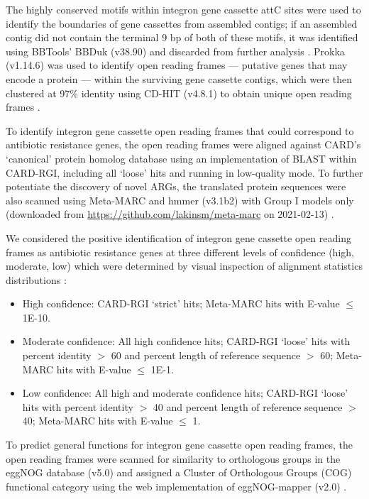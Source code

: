 The highly conserved motifs within integron gene cassette attC sites were used to identify the boundaries of gene cassettes from assembled contigs; if an assembled contig did not contain the terminal 9 bp of both of these motifs, it was identified using BBTools’ BBDuk (v38.90) and discarded from further analysis \parencite{Bushnell.2016}.
Prokka (v1.14.6) was used to identify open reading frames --- putative genes that may encode a protein --- within the surviving gene cassette contigs, which were then clustered at 97\% identity using CD-HIT (v4.8.1) to obtain unique open reading frames \parencite{Seemann.2014, Fu.2012}.

To identify integron gene cassette open reading frames that could correspond to antibiotic resistance genes, the open reading frames were aligned against \gls{CARD}’s ‘canonical’ protein homolog database using an implementation of BLAST within \gls{CARD}-RGI, including all ‘loose’ hits and running in low-quality mode.
To further potentiate the discovery of novel ARGs, the translated protein sequences were also scanned using Meta-MARC and hmmer (v3.1b2) with Group I models only (downloaded from \url{https://github.com/lakinsm/meta-marc} on 2021-02-13) \parencite{Lakin.2019, Wheeler.2013}.

We considered the positive identification of integron gene cassette open reading frames as antibiotic resistance genes at three different levels of confidence (high, moderate, low) which were determined by visual inspection of alignment statistics distributions \dummyfig:

\begin{itemize}
	\item{High confidence: \gls{CARD}-RGI ‘strict’ hits; Meta-MARC hits with E-value $\leq$ 1E-10.}
	\item{Moderate confidence: All high confidence hits; \gls{CARD}-RGI ‘loose’ hits with percent identity $>$ 60 and percent length of reference sequence $>$ 60; Meta-MARC hits with E-value $\leq$ 1E-1.}
	\item{Low confidence: All high and moderate confidence hits; \gls{CARD}-RGI ‘loose’ hits with percent identity $>$ 40 and percent length of reference sequence $>$ 40; Meta-MARC hits with E-value $\leq$ 1.}
\end{itemize}

To predict general functions for integron gene cassette open reading frames, the open reading frames were scanned for similarity to orthologous groups in the eggNOG database (v5.0) and assigned a Cluster of Orthologous Groups (\gls{COG}) functional category using the web implementation of eggNOG-mapper (v2.0) \parencite{HuertaCepas.2019}.


